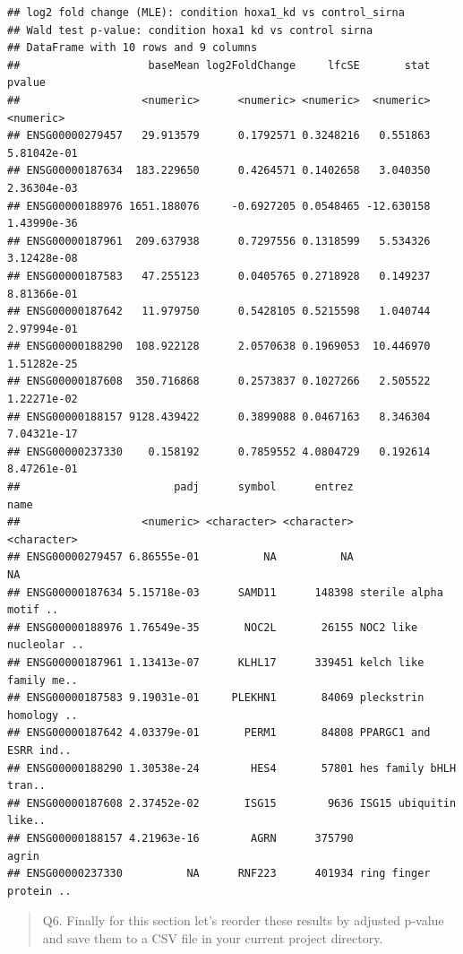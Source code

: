 \documentclass[
]{article}
\newenvironment{Shaded}{\begin{snugshade}}{\end{snugshade}}
\newcommand{\AttributeTok}[1]{\textcolor[rgb]{0.13,0.29,0.53}{#1}}
\newcommand{\FunctionTok}[1]{\textcolor[rgb]{0.13,0.29,0.53}{\textbf{#1}}}
\newcommand{\NormalTok}[1]{#1}
\newcommand{\OtherTok}[1]{\textcolor[rgb]{0.56,0.35,0.01}{#1}}
\newcommand{\SpecialCharTok}[1]{\textcolor[rgb]{0.81,0.36,0.00}{\textbf{#1}}}
\newcommand{\StringTok}[1]{\textcolor[rgb]{0.31,0.60,0.02}{#1}}
\begin{document}
\begin{verbatim}
## log2 fold change (MLE): condition hoxa1_kd vs control_sirna 
## Wald test p-value: condition hoxa1 kd vs control sirna 
## DataFrame with 10 rows and 9 columns
##                    baseMean log2FoldChange     lfcSE       stat      pvalue
##                   <numeric>      <numeric> <numeric>  <numeric>   <numeric>
## ENSG00000279457   29.913579      0.1792571 0.3248216   0.551863 5.81042e-01
## ENSG00000187634  183.229650      0.4264571 0.1402658   3.040350 2.36304e-03
## ENSG00000188976 1651.188076     -0.6927205 0.0548465 -12.630158 1.43990e-36
## ENSG00000187961  209.637938      0.7297556 0.1318599   5.534326 3.12428e-08
## ENSG00000187583   47.255123      0.0405765 0.2718928   0.149237 8.81366e-01
## ENSG00000187642   11.979750      0.5428105 0.5215598   1.040744 2.97994e-01
## ENSG00000188290  108.922128      2.0570638 0.1969053  10.446970 1.51282e-25
## ENSG00000187608  350.716868      0.2573837 0.1027266   2.505522 1.22271e-02
## ENSG00000188157 9128.439422      0.3899088 0.0467163   8.346304 7.04321e-17
## ENSG00000237330    0.158192      0.7859552 4.0804729   0.192614 8.47261e-01
##                        padj      symbol      entrez                   name
##                   <numeric> <character> <character>            <character>
## ENSG00000279457 6.86555e-01          NA          NA                     NA
## ENSG00000187634 5.15718e-03      SAMD11      148398 sterile alpha motif ..
## ENSG00000188976 1.76549e-35       NOC2L       26155 NOC2 like nucleolar ..
## ENSG00000187961 1.13413e-07      KLHL17      339451 kelch like family me..
## ENSG00000187583 9.19031e-01     PLEKHN1       84069 pleckstrin homology ..
## ENSG00000187642 4.03379e-01       PERM1       84808 PPARGC1 and ESRR ind..
## ENSG00000188290 1.30538e-24        HES4       57801 hes family bHLH tran..
## ENSG00000187608 2.37452e-02       ISG15        9636 ISG15 ubiquitin like..
## ENSG00000188157 4.21963e-16        AGRN      375790                  agrin
## ENSG00000237330          NA      RNF223      401934 ring finger protein ..
\end{verbatim}

\begin{quote}
Q6. Finally for this section let's reorder these results by adjusted
p-value and save them to a CSV file in your current project directory.
\end{quote}

\begin{Shaded}
\end{Shaded}
\end{document}
